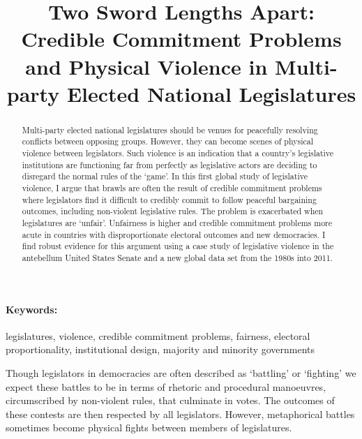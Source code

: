 \documentclass[a4paper]{article}\usepackage[]{graphicx}\usepackage[]{color}
\title{Two Sword Lengths Apart: Credible Commitment Problems and Physical Violence in Multi-party Elected National Legislatures}
\begin{document}
\maketitle

\begin{abstract}
Multi-party elected national legislatures should be venues for peacefully resolving conflicts between opposing groups. However, they can become scenes of physical violence between legislators. Such violence is an indication that a country's legislative institutions are functioning far from perfectly as legislative actors are deciding to disregard the normal rules of the `game'. In this first global study of legislative violence, I argue that brawls are often the result of credible commitment problems where legislators find it difficult to credibly commit to follow peaceful bargaining outcomes, including non-violent legislative rules. The problem is exacerbated when legislatures are `unfair'. Unfairness is higher and credible commitment problems more acute in countries with disproportionate electoral outcomes and new democracies. I find robust evidence for this argument using a case study of legislative violence in the antebellum United States Senate and a new global data set from the 1980s into 2011.
\end{abstract}


\paragraph{Keywords:} legislatures, violence, credible commitment problems, fairness, electoral proportionality, institutional design, majority and minority governments

\vspace{0.3cm}


Though legislators in democracies are often described as `battling' or `fighting' we expect these battles to be in terms of rhetoric and procedural manoeuvres, circumscribed by non-violent rules, that culminate in votes. The outcomes of these contests are then respected by all legislators. However, metaphorical battles sometimes become physical fights between members of legislatures. 
\end{document}

